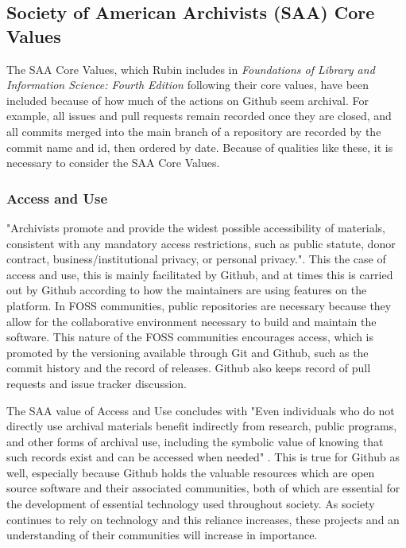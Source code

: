 \subsection{Society of American Archivists (SAA) Core Values}

The SAA Core Values, which Rubin includes in \textit{Foundations of Library and Information Science: Fourth Edition} following their core values, have been included because of how much of the actions on Github seem archival. For example, all issues and pull requests remain recorded once they are closed, and all commits merged into the main branch of a repository are recorded by the commit name and id, then ordered by date. Because of qualities like these, it is necessary to consider the SAA Core Values. 

\subsubsection{Access and Use}

"Archivists promote and provide the widest possible accessibility of materials, consistent with any mandatory access restrictions, such as public statute, donor contract, business/institutional privacy, or personal privacy."\cite{rubin2016foundationslis}. This the case of access and use, this is mainly facilitated by Github, and at times this is carried out by Github according to how the maintainers are using features on the platform. In FOSS communities, public repositories are necessary because they allow for the collaborative environment necessary to build and maintain the software. This nature of the FOSS communities encourages access, which is promoted by the versioning available through Git and Github, such as the commit history and the record of releases. Github also keeps record of pull requests and issue tracker discussion. 

The SAA value of Access and Use concludes with "Even individuals who do not directly use archival materials benefit indirectly from research, public programs, and other forms of archival use, including the symbolic value of knowing that such records exist and can be accessed when needed" \cite{rubin2016foundationslis}. This is true for Github as well, especially because Github holds the valuable resources which are open source software and their associated communities, both of which are essential for the development of essential technology used throughout society. As society continues to rely on technology and this reliance increases, these projects and an understanding of their communities will increase in importance. 


